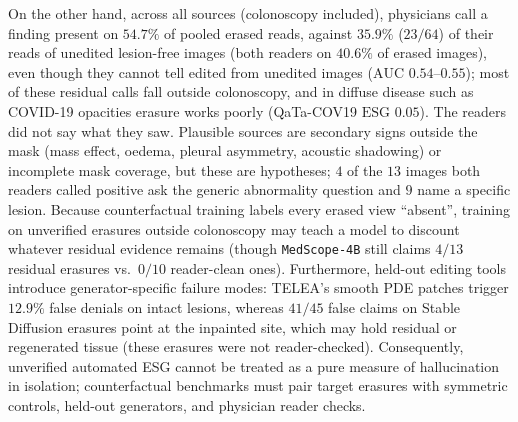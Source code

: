 \documentclass[5p,times,twocolumn,authoryear]{elsarticle}
\begin{document}
On the other hand, across all sources (colonoscopy included), physicians call a finding present on $54.7\%$ of pooled erased reads, against $35.9\%$ ($23/64$) of their reads of unedited lesion-free images (both readers on $40.6\%$ of erased images), even though they cannot tell edited from unedited images ($\text{AUC } 0.54\text{--}0.55$); most of these residual calls fall outside colonoscopy, and in diffuse disease such as COVID-19 opacities erasure works poorly (QaTa-COV19 $\text{ESG } 0.05$). The readers did not say what they saw. Plausible sources are secondary signs outside the mask (mass effect, oedema, pleural asymmetry, acoustic shadowing) or incomplete mask coverage, but these are hypotheses; $4$ of the $13$ images both readers called positive ask the generic abnormality question and $9$ name a specific lesion. Because counterfactual training labels every erased view ``absent'', training on unverified erasures outside colonoscopy may teach a model to discount whatever residual evidence remains (though \texttt{MedScope-4B} still claims $4/13$ residual erasures vs.\ $0/10$ reader-clean ones). Furthermore, held-out editing tools introduce generator-specific failure modes: TELEA's smooth PDE patches trigger $12.9\%$ false denials on intact lesions, whereas $41/45$ false claims on Stable Diffusion erasures point at the inpainted site, which may hold residual or regenerated tissue (these erasures were not reader-checked). Consequently, unverified automated ESG cannot be treated as a pure measure of hallucination in isolation; counterfactual benchmarks must pair target erasures with symmetric controls, held-out generators, and physician reader checks.
\end{document}

